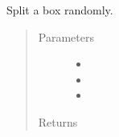 \documentclass[letterpaper,10pt,english]{sphinxmanual}
\begin{document}
\begin{fulllineitems}
\label{\detokenize{index:ho.utils_ho.std_split_rand}}
Split a box randomly.
\begin{quote}\begin{description}
\item[{Parameters}] \leavevmode\begin{itemize}
\item {} 
 \textendash{} 

\item {} 
 \textendash{} 

\item {} 
 \textendash{} 

\end{itemize}

\item[{Returns}] \leavevmode


\end{description}\end{quote}

\end{fulllineitems}

\label{\detokenize{index:module-heuristics.hyperloop}}
\end{document}
